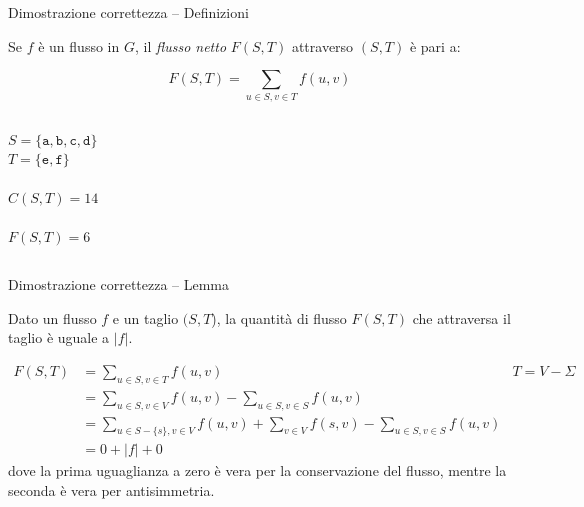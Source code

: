 \begin{frame}{Dimostrazione correttezza -- Definizioni}

\vspace{-12pt}
\begin{myboxtitle}
Se $f$ è un flusso in $G$, il {\em flusso netto} $F(S,T)$ 
attraverso $(S,T)$ è pari a:

\[
  F(S,T) = \sum_{u \in S, v \in T} f(u,v)
\]
\end{myboxtitle}

\vspace{-12pt}
\begin{columns}[T]
\vspace{18pt}
$S = \{ \mathtt{a}, \mathtt{b}, \mathtt{c}, \mathtt{d} \}$\\
$T = \{ \mathtt{e}, \mathtt{f} \}$\\
~\\
$C(S,T) = 14$\\
~\\
$F(S,T) = 6$
\end{columns}

\end{frame}

\begin{frame}{Dimostrazione correttezza -- Lemma    }
    
\vspace{-12pt}
\begin{lemma}
Dato un flusso $f$ e un taglio $(S,T$), la quantità di flusso
$F(S,T)$ che attraversa il taglio è uguale a $|f|$.
\end{lemma}

\begin{align*}
F(S,T) &= \sum_{u \in S, v \in T} f(u,v) & T = V - \Sigma\\
       &= \sum_{u \in S, v \in V} f(u,v) - \sum_{u \in S, v \in S} f(u,v) \\ 
       &= \sum_{u \in S-\{s\}, v \in V} f(u,v) + \sum_{v \in V} f(s,v) - \sum_{u \in S, v \in S} f(u,v) \\ 
       &= 0 + |f| + 0
\end{align*}
dove la prima uguaglianza a zero è vera per la conservazione del
flusso, mentre la seconda è vera per antisimmetria.
        
\end{frame}

